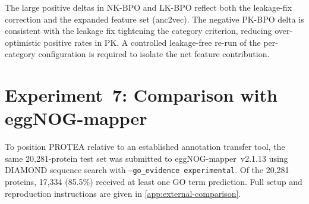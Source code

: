 The large positive deltas in NK-BPO and LK-BPO reflect both the
leakage-fix correction and the expanded feature set (anc2vec). The negative
PK-BPO delta is consistent with the leakage fix tightening the category
criterion, reducing over-optimistic positive rates in PK. A controlled
leakage-free re-run of the per-category configuration is required to isolate the
net feature contribution.

\section{Experiment~7: Comparison with eggNOG-mapper}
\label{subsec:exp7-eggnogmapper}

To position PROTEA relative to an established annotation transfer tool,
the same 20,281-protein test set was submitted to eggNOG-mapper~v2.1.13
\cite{cantalapiedra2021eggnogmapper} using DIAMOND sequence search with
\texttt{--go\_evidence experimental}. Of the 20,281 proteins, 17,334
(85.5\%) received at least one GO term prediction. Full setup and
reproduction instructions are given in \cref{app:external-comparison}.

\begin{table}[htbp]
  \centering
  \caption[Fmax: eggNOG-mapper vs.\ PROTEA methods]{$F_{\max}$: eggNOG-mapper vs.\ PROTEA methods (IA-weighted).}
  \label{tab:results-emapper}
\end{table}


